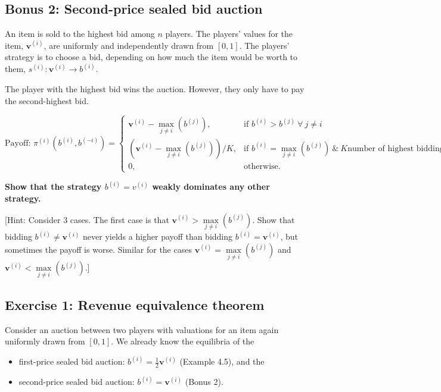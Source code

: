 \documentclass[10pt]{article}
\begin{document}
\subsection*{Bonus 2: Second-price sealed bid auction}

An item is sold to the highest bid among \(n\) players. The players' values for
the item, \(\mathbf{v}^{(i)}\), are uniformly and independently drawn from \([0, 1]\).
The players' strategy is to choose a bid, depending on how much the item would be
worth to them, \(s^{(i)}: \mathbf{v}^{(i)} \rightarrow b^{(i)}\).

The player with the highest bid wins the auction. However, they only have to
pay the second-highest bid.

\begin{equation*}
\text{Payoff: }    \pi^{(i)} (b^{(i)}, b^{(-i)}) = 
    \begin{cases}
        \mathbf{v}^{(i)} - \max\limits_{j \neq i}(b^{(j)}), & \text{if } b^{(i)} > b^{(j)} \ \forall \ j \neq i \\
        (\mathbf{v}^{(i)} - \max\limits_{j \neq i}(b^{(j)})) / K, & \text{if } b^{(i)} = \max\limits_{j \neq i} (b^{(j)}) \ \& \ K \text{number of highest biddings}\\
        0,              & \text{otherwise}.
    \end{cases}
\end{equation*}

\textbf{Show that the strategy \(b^{(i)} = v^{(i)}\) weakly dominates any other
strategy.}

[Hint: Consider 3 cases. The first case is that \(\textbf{v}^{(i)} > \max\limits_{j \neq i} (b^{(j)})\).
Show that bidding \(b^{(i)} \neq \textbf{v}^{(i)}\) never yields a higher payoff than bidding
\(b^{(i)} = \textbf{v}^{(i)}\), but sometimes the payoff is worse. Similar for the cases
\(\textbf{v}^{(i)} = \max\limits_{j \neq i} (b^{(j)})\) and \(\textbf{v}^{(i)} < \max\limits_{j \neq i} (b^{(j)})\).]


\subsection*{Exercise 1: Revenue equivalence theorem}

Consider an auction between two players with valuations for an item again uniformly
drawn from \([0, 1]\). We already know the equilibria of the


\begin{itemize}
    \item first-price sealed bid auction: \(b ^ {(i)} =  \frac{1}{2} \textbf{v}^{(i)}\) (Example 4.5), and the
    \item second-price sealed bid auction: \(b ^ {(i)} =  \textbf{v}^{(i)}\) (Bonus 2).
\end{itemize}
\end{document}
